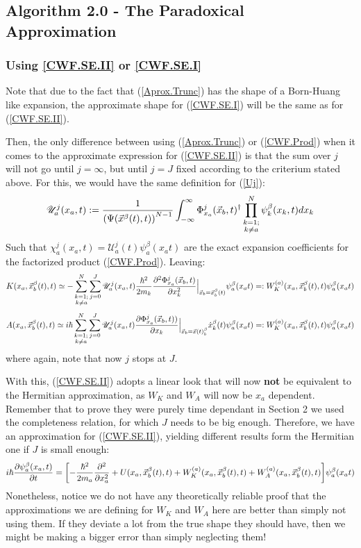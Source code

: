 \documentclass[11pt, a4paper]{article} %
\newcommand{\U}{\mathscr{U}}
\begin{document}
\subsection{Algorithm 2.0 - The Paradoxical Approximation }
\subsubsection{Using \ref{CWF.SE.II} or \ref{CWF.SE.I}}
Note that due to the fact that (\ref{Aprox.Trunc}) has the shape of a Born-Huang like expansion, the approximate shape for (\ref{CWF.SE.I}) will be the same as for (\ref{CWF.SE.II}).

Then, the only difference between using (\ref{Aprox.Trunc}) or (\ref{CWF.Prod}) when it comes to the approximate expression for (\ref{CWF.SE.II}) is that the sum over $j$ will not go until $j=\infty$, but until $j=J$ fixed according to the criterium stated above. For this, we would have the same definition for (\ref{Uj}):
$$
\U^j_a(x_a, t):=\frac{1}{ \qty(\Psi(\vec{x}^\beta(t),t))^{N-1}} \int_{-\infty}^\infty \Phi_{x_a}^j(\vec{x}_b,t)^\dagger \prod_{\substack{k=1; \\ k\neq a}}^{N} \psi^\beta_k(x_k,t) dx_k 
$$
Such that $\chi_a^j(x_a,t)= \U^j_a(t)\psi_a^\beta(x_a t)$ are the exact expansion coefficients for the factorized product (\ref{CWF.Prod}). Leaving:
$$
K(x_a, \vec{x}_b^\beta(t), t) \simeq - \sum_{\substack{k=1; \\ k\neq a}}^{N} \sum_{j=0}^J \U^j_a(x_a,t) \frac{\hbar^2}{2m_k} \pdv[2]{ \Phi_{x_a}^j(\vec{x}_b,t)}{x_k}\Big\rvert_{\vec{x}_b=\vec{x}_b^\beta(t)}\psi_a^\beta(x_a t)=:W_K^{(a)}(x_a, \vec{x}_b^\beta (t),t)\psi_a^\beta(x_a t)
$$
$$
A(x_a, \vec{x}_b^\beta(t), t) \simeq i \hbar \sum_{\substack{k=1; \\ k\neq a}}^{N} \sum_{j=0}^J \U^j_a(x_a,t) \pdv{ \Phi_{x_a}^j(\vec{x}_b,t))}{x_k}\Big\rvert_{\vec{x}_b=\vec{x}(t)_b^\beta} \dot{x}_k^\beta(t)\psi_a^\beta(x_a t)=:W_K^{(a)}(x_a, \vec{x}_b^\beta (t),t)\psi_a^\beta(x_a t)
$$
where again, note that now $j$ stops at $J$. 

With this, (\ref{CWF.SE.II}) adopts a linear look that will now {\bf not} be equivalent to the Hermitian approximation, as $W_K$ and $W_A$ will now be $x_a$ dependent. Remember that to prove they were purely time dependant in Section 2 we used the completeness relation, for which $J$ needs to be big enough. Therefore, we have an approximation for (\ref{CWF.SE.II}), yielding different results form the Hermitian one if $J$ is small enough:
$$
i\hbar \pdv{\psi_a^\beta(x_a, t)}{t} = \qty[- \frac{\hbar^2}{2m_a}\pdv[2]{}{x_a} + U(x_a, \vec{x}_b^\beta(t), t)+ W^{(a)}_K(x_a,\vec{x}_b^\beta (t),t) +W^{(a)}_A(x_a,\vec{x}_b^\beta (t),t) ]\psi_a^\beta(x_a t)
$$
Nonetheless, notice we do not have any theoretically reliable proof that the approximations we are defining for $W_K$ and $W_A$ here are better than simply not using them. If they deviate a lot from the true shape they should have, then we might be making a bigger error than simply neglecting them!
\end{document}
